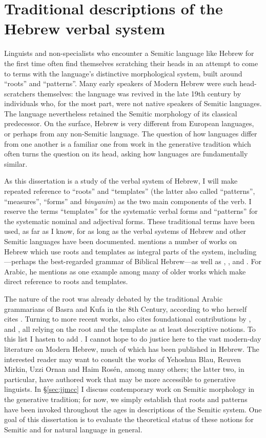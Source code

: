 \section{Traditional descriptions of the Hebrew verbal system} \label{sec:tradition}
Linguists and non-specialists who encounter a Semitic language like Hebrew for the first time often find themselves scratching their heads in an attempt to come to terms with the language's distinctive morphological system, built around ``roots'' and ``patterns''. Many early speakers of Modern Hebrew were such head-scratchers themselves: the language was revived in the late 19th century by individuals who, for the most part, were not native speakers of Semitic languages. The language nevertheless retained the Semitic morphology of its classical predecessor. On the surface, Hebrew is very different from European languages, or perhaps from any non-Semitic language. The question of how languages differ from one another is a familiar one from work in the generative tradition which often turns the question on its head, asking how languages are fundamentally similar.

As this dissertation is a study of the verbal system of Hebrew, I will make repeated reference to ``roots'' and ``templates'' (the latter also called ``patterns'', ``measures'', ``forms'' and \emph{binyanim}) as the two main components of the verb. I reserve the terms ``templates'' for the systematic verbal forms and ``patterns'' for the systematic nominal and adjectival forms. These traditional terms have been used, as far as I know, for as long as the verbal systems of Hebrew and other Semitic languages have been documented. \cite{ussishkin00phd} mentions a number of works on Hebrew which use roots and templates as integral parts of the system, including \cite{gesenius}---perhaps the best-regarded grammar of Biblical Hebrew---as well as \cite{bopp1824}, \cite{ewald1827}, \cite{harris41} and \cite{chomsky51}. For Arabic, he mentions \cite{desacy1810} as one example among many of older works which make direct reference to roots and templates.

The nature of the root was already debated by the traditional Arabic grammarians of Basra and Kufa in the 8th Century, according to \citet[563ff]{borer13oup} who herself cites \cite{owens88}. Turning to more recent works, \cite{borer13oup} also cites foundational contributions by \cite{berman78}, \cite{bolozky78,bolozky99} and \cite{ravid90}, all relying on the root and the template as at least descriptive notions. To this list I hasten to add \cite{rosen77}. I cannot hope to do justice here to the vast modern-day literature on Modern Hebrew, much of which has been published in Hebrew. The interested reader may want to consult the works of Yehoshua Blau, Reuven Mirkin, Uzzi Ornan and Haim Ros\'en, among many others; the latter two, in particular, have authored work that may be more accessible to generative linguists. In \S\ref{sec:jjmcc} I discuss contemporary work on Semitic morphology in the generative tradition; for now, we simply establish that roots and patterns have been invoked throughout the ages in descriptions of the Semitic system. One goal of this dissertation is to evaluate the theoretical status of these notions for Semitic and for natural language in general.

